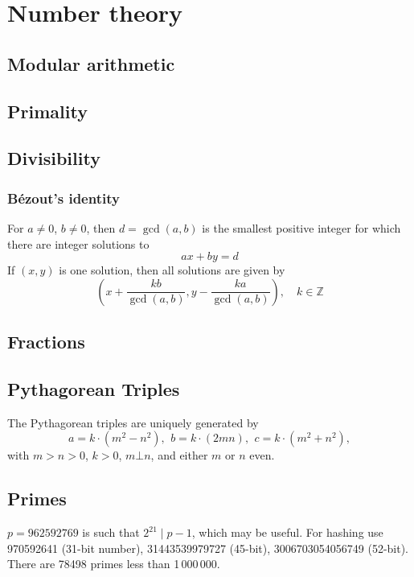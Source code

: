 \chapter{Number theory}

\section{Modular arithmetic}

\section{Primality}

\section{Divisibility}

	\subsection{Bézout's identity}
	For $a \neq 0$, $b \neq 0$, then $d=\gcd(a,b)$ is the smallest positive integer for which there are integer solutions to
	$$ax+by=d$$
	If $(x,y)$ is one solution, then all solutions are given by
	$$\left(x+\frac{kb}{\gcd(a,b)}, y-\frac{ka}{\gcd(a,b)}\right), \quad k\in\mathbb{Z}$$


\section{Fractions}

\section{Pythagorean Triples}
 The Pythagorean triples are uniquely generated by
 \[ a=k\cdot (m^{2}-n^{2}),\ \,b=k\cdot (2mn),\ \,c=k\cdot (m^{2}+n^{2}), \]
 with $m > n > 0$, $k > 0$, $m \bot n$, and either $m$ or $n$ even.

\section{Primes}
	$p=962592769$ is such that $2^{21} \mid p-1$, which may be useful. For hashing
	use 970592641 (31-bit number), 31443539979727 (45-bit), 3006703054056749
	(52-bit). There are 78498 primes less than 1\,000\,000.

